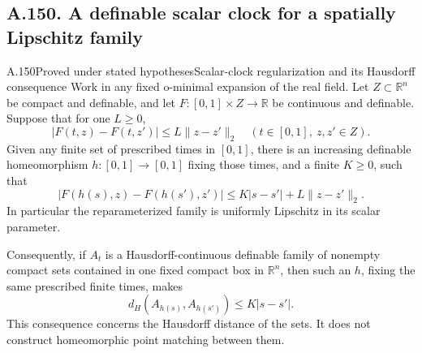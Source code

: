 \subsection{A.150. A definable scalar clock for a spatially Lipschitz family}

\begin{saresult}{A.150}{Proved under stated hypotheses}{Scalar-clock regularization and its Hausdorff consequence}
Work in any fixed o-minimal expansion of the real field.
Let $Z\subset\mathbb R^n$ be compact and definable, and let
$F:[0,1]\times Z\to\mathbb R$ be continuous and definable.
Suppose that for one $L\ge0$,
\[
 |F(t,z)-F(t,z')|\le L\|z-z'\|_2
 \quad(t\in[0,1],\ z,z'\in Z).
 \tag{150.1}
\]
Given any finite set of prescribed times in $[0,1]$, there is an
increasing definable homeomorphism $h:[0,1]\to[0,1]$ fixing those
times, and a finite $K\ge0$, such that
\[
 |F(h(s),z)-F(h(s'),z')|
 \le K|s-s'|+L\|z-z'\|_2.
 \tag{150.2}
\]
In particular the reparameterized family is uniformly Lipschitz in
its scalar parameter.

Consequently, if $A_t$ is a Hausdorff-continuous definable family of
nonempty compact sets contained in one fixed compact box in
$\mathbb R^n$, then such an $h$, fixing the same prescribed finite
times, makes
\[
 d_H(A_{h(s)},A_{h(s')})\le K|s-s'|.
 \tag{150.3}
\]
This consequence concerns the Hausdorff distance of the sets. It does
not construct homeomorphic point matching between them.
\end{saresult}

